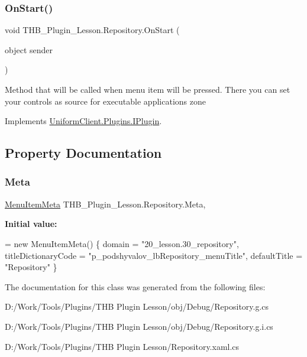 \subsubsection{\texorpdfstring{On\+Start()}{OnStart()}}
{\footnotesize\ttfamily void T\+H\+B\+\_\+\+Plugin\+\_\+\+Lesson.\+Repository.\+On\+Start (\begin{DoxyParamCaption}\item[{object}]{sender }\end{DoxyParamCaption})}



Method that will be called when menu item will be pressed. There you can set your controls as source for executable application\textquotesingle{}s zone 



Implements \mbox{\hyperlink{interface_uniform_client_1_1_plugins_1_1_i_plugin_a1ca2220c7ce4a23f8f41af10efccf328}{Uniform\+Client.\+Plugins.\+I\+Plugin}}.



\subsection{Property Documentation}
\mbox{\label{class_t_h_b___plugin___lesson_1_1_repository_aa8951c83aac524f207e3b97c83fa226e}} 
\subsubsection{\texorpdfstring{Meta}{Meta}}
{\footnotesize\ttfamily \mbox{\hyperlink{class_uniform_client_1_1_plugins_1_1_menu_item_meta}{Menu\+Item\+Meta}} T\+H\+B\+\_\+\+Plugin\+\_\+\+Lesson.\+Repository.\+Meta\hspace{0.3cm}{\ttfamily [get]}, {\ttfamily [set]}}

{\bfseries Initial value\+:}
\begin{DoxyCode}
= \textcolor{keyword}{new} MenuItemMeta()
        \{
            domain = \textcolor{stringliteral}{"20\_lesson.30\_repository"},
            titleDictionaryCode = \textcolor{stringliteral}{"p\_podshyvalov\_lbRepository\_menuTitle"},
            defaultTitle = \textcolor{stringliteral}{"Repository"}
        \}
\end{DoxyCode}


The documentation for this class was generated from the following files\+:\begin{DoxyCompactItemize}
\item 
D\+:/\+Work/\+Tools/\+Plugins/\+T\+H\+B Plugin Lesson/obj/\+Debug/Repository.\+g.\+cs\item 
D\+:/\+Work/\+Tools/\+Plugins/\+T\+H\+B Plugin Lesson/obj/\+Debug/Repository.\+g.\+i.\+cs\item 
D\+:/\+Work/\+Tools/\+Plugins/\+T\+H\+B Plugin Lesson/Repository.\+xaml.\+cs\end{DoxyCompactItemize}
